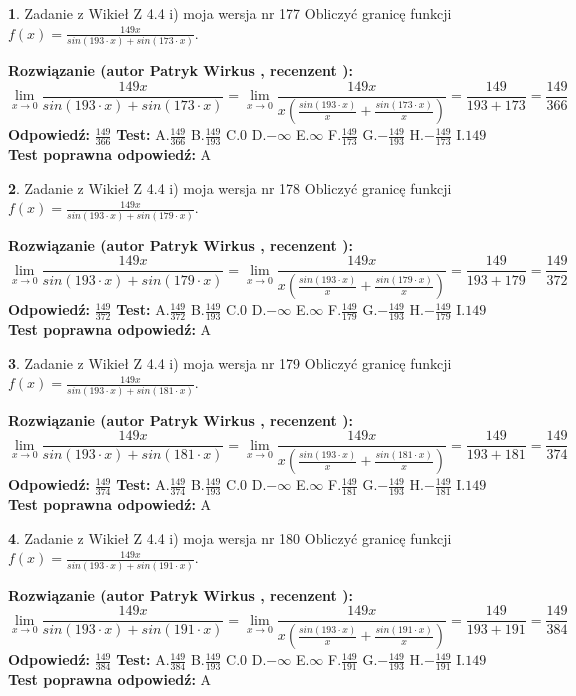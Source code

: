 \documentclass[12pt, a4paper]{article}
\theoremstyle{definition} %
\newtheorem{zad}{}
\newcommand{\zadStart}[1]{\begin{zad}#1\newline}
\newcommand{\zadStop}{\end{zad}}
\newcommand{\rozwStart}[2]{\noindent \textbf{Rozwiązanie (autor #1 , recenzent #2): }\newline}
\newcommand{\rozwStop}{\newline}
\newcommand{\odpStart}{\noindent \textbf{Odpowiedź:}\newline}
\newcommand{\odpStop}{\newline}
\newcommand{\testStart}{\noindent \textbf{Test:}\newline}
\newcommand{\testStop}{\newline}
\newcommand{\kluczStart}{\noindent \textbf{Test poprawna odpowiedź:}\newline}
\newcommand{\kluczStop}{\newline}
\begin{document}
\zadStart{Zadanie z Wikieł Z 4.4 i) moja wersja nr 177}
Obliczyć granicę funkcji $f(x)=\frac{149x}{sin(193\cdot x) +sin(173\cdot x)}$.
\zadStop
\rozwStart{Patryk Wirkus}{}
$$\lim\limits_{x\to 0}\frac{149x}{sin(193\cdot x) +sin(173\cdot x)}=\lim\limits_{x\to 0}\frac{149x}{x(\frac{sin(193\cdot x)}{x}+\frac{sin(173\cdot x)}{x})}=\frac{149}{193+173} = \frac{149}{366}$$
\rozwStop
\odpStart
$\frac{149}{366}$
\odpStop
\testStart
A.$\frac{149}{366}$
B.$\frac{149}{193}$
C.$0$
D.$-\infty$
E.$\infty$
F.$\frac{149}{173}$
G.$-\frac{149}{193}$
H.$-\frac{149}{173}$
I.$149$
\testStop
\kluczStart
A
\kluczStop



\zadStart{Zadanie z Wikieł Z 4.4 i) moja wersja nr 178}
Obliczyć granicę funkcji $f(x)=\frac{149x}{sin(193\cdot x) +sin(179\cdot x)}$.
\zadStop
\rozwStart{Patryk Wirkus}{}
$$\lim\limits_{x\to 0}\frac{149x}{sin(193\cdot x) +sin(179\cdot x)}=\lim\limits_{x\to 0}\frac{149x}{x(\frac{sin(193\cdot x)}{x}+\frac{sin(179\cdot x)}{x})}=\frac{149}{193+179} = \frac{149}{372}$$
\rozwStop
\odpStart
$\frac{149}{372}$
\odpStop
\testStart
A.$\frac{149}{372}$
B.$\frac{149}{193}$
C.$0$
D.$-\infty$
E.$\infty$
F.$\frac{149}{179}$
G.$-\frac{149}{193}$
H.$-\frac{149}{179}$
I.$149$
\testStop
\kluczStart
A
\kluczStop



\zadStart{Zadanie z Wikieł Z 4.4 i) moja wersja nr 179}
Obliczyć granicę funkcji $f(x)=\frac{149x}{sin(193\cdot x) +sin(181\cdot x)}$.
\zadStop
\rozwStart{Patryk Wirkus}{}
$$\lim\limits_{x\to 0}\frac{149x}{sin(193\cdot x) +sin(181\cdot x)}=\lim\limits_{x\to 0}\frac{149x}{x(\frac{sin(193\cdot x)}{x}+\frac{sin(181\cdot x)}{x})}=\frac{149}{193+181} = \frac{149}{374}$$
\rozwStop
\odpStart
$\frac{149}{374}$
\odpStop
\testStart
A.$\frac{149}{374}$
B.$\frac{149}{193}$
C.$0$
D.$-\infty$
E.$\infty$
F.$\frac{149}{181}$
G.$-\frac{149}{193}$
H.$-\frac{149}{181}$
I.$149$
\testStop
\kluczStart
A
\kluczStop



\zadStart{Zadanie z Wikieł Z 4.4 i) moja wersja nr 180}
Obliczyć granicę funkcji $f(x)=\frac{149x}{sin(193\cdot x) +sin(191\cdot x)}$.
\zadStop
\rozwStart{Patryk Wirkus}{}
$$\lim\limits_{x\to 0}\frac{149x}{sin(193\cdot x) +sin(191\cdot x)}=\lim\limits_{x\to 0}\frac{149x}{x(\frac{sin(193\cdot x)}{x}+\frac{sin(191\cdot x)}{x})}=\frac{149}{193+191} = \frac{149}{384}$$
\rozwStop
\odpStart
$\frac{149}{384}$
\odpStop
\testStart
A.$\frac{149}{384}$
B.$\frac{149}{193}$
C.$0$
D.$-\infty$
E.$\infty$
F.$\frac{149}{191}$
G.$-\frac{149}{193}$
H.$-\frac{149}{191}$
I.$149$
\testStop
\kluczStart
A
\kluczStop
\end{document}
